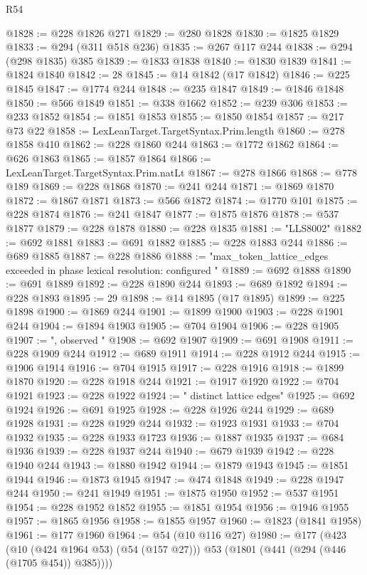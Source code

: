 \begin{lexlean}{R54}
\begin{coremodule}
@1828 := @228 @1826 @271
@1829 := @280 @1828
@1830 := @1825 @1829
@1833 := @294 (@311 @518 @236)
@1835 := @267 @117 @244
@1838 := @294 (@298 @1835) @385
@1839 := @1833 @1838
@1840 := @1830 @1839
@1841 := @1824 @1840
@1842 := 28
@1845 := @14 @1842 (@17 @1842)
@1846 := @225 @1845
@1847 := @1774 @244
@1848 := @235 @1847
@1849 := @1846 @1848
@1850 := @566 @1849
@1851 := @338 @1662
@1852 := @239 @306
@1853 := @233 @1852
@1854 := @1851 @1853
@1855 := @1850 @1854
@1857 := @217 @73 @22
@1858 := LexLeanTarget.TargetSyntax.Prim.length
@1860 := @278 @1858 @410
@1862 := @228 @1860 @244
@1863 := @1772 @1862
@1864 := @626 @1863
@1865 := @1857 @1864
@1866 := LexLeanTarget.TargetSyntax.Prim.natLt
@1867 := @278 @1866
@1868 := @778 @189
@1869 := @228 @1868
@1870 := @241 @244
@1871 := @1869 @1870
@1872 := @1867 @1871
@1873 := @566 @1872
@1874 := @1770 @101
@1875 := @228 @1874
@1876 := @241 @1847
@1877 := @1875 @1876
@1878 := @537 @1877
@1879 := @228 @1878
@1880 := @228 @1835
@1881 := "LLS8002"
@1882 := @692 @1881
@1883 := @691 @1882
@1885 := @228 @1883 @244
@1886 := @689 @1885
@1887 := @228 @1886
@1888 := "max_token_lattice_edges exceeded in phase lexical resolution: configured "
@1889 := @692 @1888
@1890 := @691 @1889
@1892 := @228 @1890 @244
@1893 := @689 @1892
@1894 := @228 @1893
@1895 := 29
@1898 := @14 @1895 (@17 @1895)
@1899 := @225 @1898
@1900 := @1869 @244
@1901 := @1899 @1900
@1903 := @228 @1901 @244
@1904 := @1894 @1903
@1905 := @704 @1904
@1906 := @228 @1905
@1907 := ", observed "
@1908 := @692 @1907
@1909 := @691 @1908
@1911 := @228 @1909 @244
@1912 := @689 @1911
@1914 := @228 @1912 @244
@1915 := @1906 @1914
@1916 := @704 @1915
@1917 := @228 @1916
@1918 := @1899 @1870
@1920 := @228 @1918 @244
@1921 := @1917 @1920
@1922 := @704 @1921
@1923 := @228 @1922
@1924 := " distinct lattice edges"
@1925 := @692 @1924
@1926 := @691 @1925
@1928 := @228 @1926 @244
@1929 := @689 @1928
@1931 := @228 @1929 @244
@1932 := @1923 @1931
@1933 := @704 @1932
@1935 := @228 @1933 @1723
@1936 := @1887 @1935
@1937 := @684 @1936
@1939 := @228 @1937 @244
@1940 := @679 @1939
@1942 := @228 @1940 @244
@1943 := @1880 @1942
@1944 := @1879 @1943
@1945 := @1851 @1944
@1946 := @1873 @1945
@1947 := @474 @1848
@1949 := @228 @1947 @244
@1950 := @241 @1949
@1951 := @1875 @1950
@1952 := @537 @1951
@1954 := @228 @1952 @1852
@1955 := @1851 @1954
@1956 := @1946 @1955
@1957 := @1865 @1956
@1958 := @1855 @1957
@1960 := @1823 (@1841 @1958)
@1961 := @177 @1960
@1964 := @54 (@10 @116 @27)
@1980 := @177
    (@423
      (@10 (@424 @1964 @53) (@54 (@157 @27)))
      @53
      (@1801 (@441 (@294 (@446 (@1705 @454)) @385))))

\end{coremodule}
\end{lexlean}
